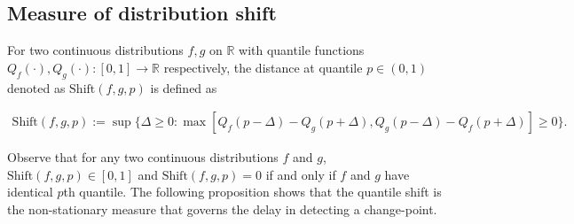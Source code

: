 

\subsection{Measure of distribution shift}



\begin{definition}
For two continuous distributions $f,g$  on $\mathbb{R}$ with quantile functions  $Q_f(\cdot), Q_g(\cdot) : [0,1] \to \mathbb{R}$ respectively, the distance at quantile $p \in (0,1)$ denoted as $\text{Shift}(f,g,p)$ is defined as

\begin{multline*}
    \text{Shift}(f,g,p) := \sup \{ \Delta \geq 0: \max[Q_f\left(p-{\Delta}\right) -  Q_g\left(p + {\Delta}\right) ,  Q_g\left(p-{\Delta}\right) - Q_f\left(p + {\Delta}\right) ] \geq 0 \}.
    \end{multline*}
\label{def:quantile_shift}
\end{definition}

Observe that for any two continuous distributions $f$ and $g$, $\text{Shift}(f,g,p) \in [0,1]$ and $\text{Shift}(f,g,p) = 0$ if and only if $f$ and $g$ have identical $p$th quantile. %
The following proposition shows that the quantile shift is the non-stationary measure that governs the delay in detecting a change-point.

